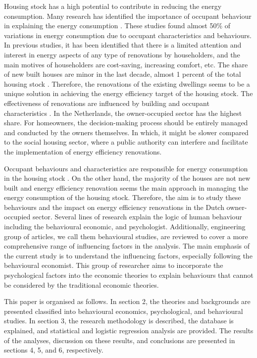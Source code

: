 \documentclass[preprint,12pt,3p]{elsarticle}
\begin{document}
Housing stock has a high potential to contribute in reducing the energy consumption. Many research has identified the importance of occupant behaviour in explaining the energy consumption \citep{huebner2016, van2019actual}. These studies found almost 50\% of variations in energy consumption due to occupant characteristics and behaviours. In previous studies, it has been identified that there is a limited attention and interest in energy aspects of any type of renovations by householders, and the main motives of householders are cost-saving, increasing comfort, etc. 
The share of new built houses are minor in the last decade, almost 1 percent of the total housing stock \citep{cbs2020}. Therefore, the renovations of the existing dwellings seems to be a unique solution in achieving the energy efficiency target of the housing stock. The effectiveness of renovations are influenced by building and occupant characteristics \citep{van2019actual}. In the Netherlands, the owner-occupied sector has the highest share. For homeowners, the decision-making process should be entirely managed and conducted by the owners themselves. In which, it might be slower compared to the social housing sector, where a public authority can interfere and facilitate the implementation of energy efficiency renovations.  
\noindent

Occupant behaviours and characteristics are responsible for energy consumption in the housing stock \citep{huebner2016, guerra2010, steemers2009}. On the other hand, the majority of the houses are not new built and energy efficiency renovation seems the main approach in managing the energy consumption of the housing stock. Therefore, the aim is to study these behaviours and the impact on energy efficiency renovations in the Dutch owner-occupied sector. Several lines of research explain the logic of human behaviour including the behavioural economic, and psychologist. Additionally, engineering group of articles, we call them behavioural studies, are reviewed to cover a more comprehensive range of influencing factors in the analysis. The main emphasis of the current study is to understand the influencing factors, especially following the behavioural economist. This group of researcher aims to incorporate the psychological factors into the economic theories to explain behaviours that cannot be considered by the traditional economic theories. 

This paper is organised as follows. In section 2, the theories and backgrounds are presented classified into behavioural economics, psychological, and behavioural studies. In section 3, the research methodology is described, the database is explained, and statistical and logistic regression analysis are provided. The results of the analyses, discussion on these results, and conclusions are presented in sections 4, 5, and 6, respectively.
\end{document}
